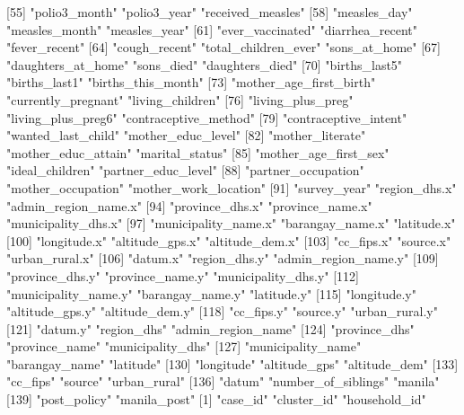  [55] "polio3_month"              "polio3_year"               "received_measles"         
 [58] "measles_day"               "measles_month"             "measles_year"             
 [61] "ever_vaccinated"           "diarrhea_recent"           "fever_recent"             
 [64] "cough_recent"              "total_children_ever"       "sons_at_home"             
 [67] "daughters_at_home"         "sons_died"                 "daughters_died"           
 [70] "births_last5"              "births_last1"              "births_this_month"        
 [73] "mother_age_first_birth"    "currently_pregnant"        "living_children"          
 [76] "living_plus_preg"          "living_plus_preg6"         "contraceptive_method"     
 [79] "contraceptive_intent"      "wanted_last_child"         "mother_educ_level"        
 [82] "mother_literate"           "mother_educ_attain"        "marital_status"           
 [85] "mother_age_first_sex"      "ideal_children"            "partner_educ_level"       
 [88] "partner_occupation"        "mother_occupation"         "mother_work_location"     
 [91] "survey_year"               "region_dhs.x"              "admin_region_name.x"      
 [94] "province_dhs.x"            "province_name.x"           "municipality_dhs.x"       
 [97] "municipality_name.x"       "barangay_name.x"           "latitude.x"               
[100] "longitude.x"               "altitude_gps.x"            "altitude_dem.x"           
[103] "cc_fips.x"                 "source.x"                  "urban_rural.x"            
[106] "datum.x"                   "region_dhs.y"              "admin_region_name.y"      
[109] "province_dhs.y"            "province_name.y"           "municipality_dhs.y"       
[112] "municipality_name.y"       "barangay_name.y"           "latitude.y"               
[115] "longitude.y"               "altitude_gps.y"            "altitude_dem.y"           
[118] "cc_fips.y"                 "source.y"                  "urban_rural.y"            
[121] "datum.y"                   "region_dhs"                "admin_region_name"        
[124] "province_dhs"              "province_name"             "municipality_dhs"         
[127] "municipality_name"         "barangay_name"             "latitude"                 
[130] "longitude"                 "altitude_gps"              "altitude_dem"             
[133] "cc_fips"                   "source"                    "urban_rural"              
[136] "datum"                     "number_of_siblings"        "manila"                   
[139] "post_policy"               "manila_post"              
  [1] "case_id"                   "cluster_id"                "household_id"             
